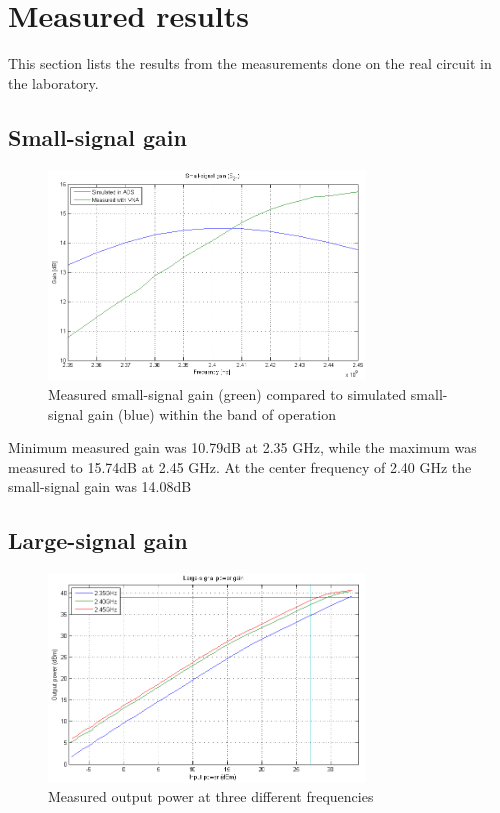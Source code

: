   \section{Measured results}
  This section lists the results from the measurements done on the real circuit in the laboratory.

  \subsection{Small-signal gain}

  \begin{figure}[H]
	  \centering
	  \includegraphics[width=0.75\textwidth]{img/S21_meas_sim}
	  \caption{Measured small-signal gain (green) compared to simulated small-signal gain (blue) within the band of operation}
	  \label{fig:Meas_S21}
  \end{figure}

Minimum measured gain was 10.79dB at 2.35 GHz, while the maximum was measured to 15.74dB at 2.45 GHz. At the center frequency of 2.40 GHz the small-signal gain was 14.08dB

  \subsection{Large-signal gain}

  \begin{figure}[h]
	  \centering
	  \includegraphics[width=0.75\textwidth]{img/Power_Out_1tone}
	  \caption{Measured output power at three different frequencies}
	  \label{fig:Meas_Pout}
  \end{figure}

